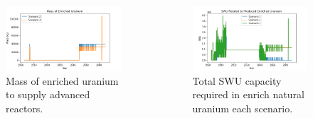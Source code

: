 \begin{frame}
\begin{columns}
      \column[t]{5cm}
  \begin{figure}[t]
      \includegraphics[scale=0.25,trim=0 5 0 10,clip]{figures/enrichedU_advancedrx.png}
      \caption{Mass of enriched uranium to supply advanced reactors.}
      \label{fig:enrichedU}
  \end{figure}
  \begin{figure}[h]
      \includegraphics[scale=0.25,trim=0 5 0 10,clip]{figures/swu_all.png}
      \caption{Total \gls{SWU} capacity required in enrich natural uranium each scenario.}
      \label{fig:swu}
  \end{figure}
  \end{columns}
\end{frame}


